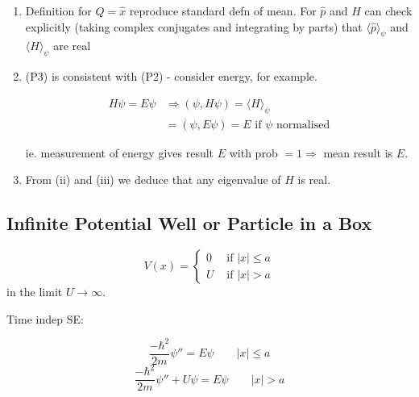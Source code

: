 \documentclass[a4paper]{article}
\begin{document}
\begin{eg}
\begin{enumerate}
	\item Definition for $ Q = \hat{x} $ reproduce standard defn of mean. 
	For $ \hat{p} $ and $ H $ can check explicitly (taking complex conjugates and integrating by parts) that $ \langle \hat{p} \rangle_{\psi} $ and $ \langle H \rangle_{\psi} $ are real
	
	\item (P3) is consistent with (P2) - consider energy, for example.
	


	\begin{align*}
		H \psi = E \psi & \Rightarrow (\psi, H \psi) = \langle H \rangle_{\psi}  \\
		& = (\psi, E \psi ) = E \text{ if } \psi \text{ normalised}
	\end{align*}
	
	ie. measurement of energy gives result $ E $ with prob $ = 1  \Rightarrow $ mean result is $ E $.
	
	\item From (ii) and (iii) we deduce that any eigenvalue of $ H $ is real. 

\end{enumerate}

\end{eg}

\subsection{Infinite Potential Well or Particle in a Box }

\begin{center}
\end{center}

\[ V(x) = \begin{cases} 0  & \text{ if } | x |  \leq a \\ U & \text{ if } | x | > a \end{cases} \] in the limit $ U \to \infty $.

Time indep SE:

\[ \frac{-\hbar^{2}}{2m} \psi''  = E \psi \qquad | x  | \leq a \]
\[ \frac{-\hbar^{2}}{2m} \psi'' + U \psi = E \psi \qquad | x | > a \]
\end{document}
